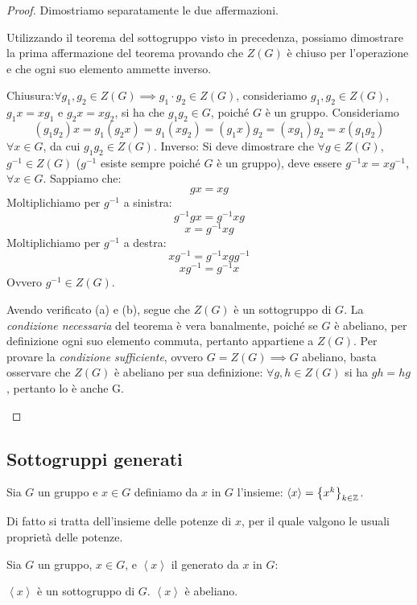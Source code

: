 \documentclass[11pt]{scrartcl}
\begin{document}
\begin{proof}
Dimostriamo separatamente le due affermazioni.
	\begin{enumerate}[(1)]
		\ii Utilizzando il teorema del sottogruppo visto in precedenza, possiamo dimostrare la prima affermazione del teorema provando che $Z(G)$ è chiuso per l'operazione e che ogni suo elemento ammette inverso.
			\begin{enumerate}[(a)]
			\ii Chiusura:$\forall g_1,g_2 \in Z(G) \implies g_1 \cdot g_2 \in Z(G)$, consideriamo $g_1,g_2 \in Z(G)$, $g_1x=xg_1$ e $g_2x=xg_2$, si ha che $g_1g_2 \in G$, poiché $G$ è un gruppo. Consideriamo
				\[ (g_1g_2)x
				=
				g_1(g_2x)
				=
				g_1(xg_2)
				=
				(g_1x)g_2
				=
				(xg_1)g_2
				=
				x(g_1g_2)
				\]
			$\forall x \in G$, da cui $g_1g_2 \in Z(G)$.	
			\ii Inverso: Si deve dimostrare che $\forall g \in Z(G)$, $ g^{-1} \in Z(G)$ ($g^{-1}$ esiste sempre poiché $G$ è un gruppo), deve essere $g^{-1}x=xg^{-1}$, $\forall x \in G$. Sappiamo che:
				\[
				gx=xg
				\]
			Moltiplichiamo per $g^{-1}$ a sinistra:	
				\[
				g^{-1}gx=g^{-1}xg
				\]
				\[
				x=g^{-1}xg
				\]
			Moltiplichiamo per $g^{-1}$ a destra:
				\[
				xg^{-1}=g^{-1}xgg^{-1}
				\]
				\[
				xg^{-1}=g^{-1}x
				\]
			Ovvero $g^{-1} \in Z(G)$.
			\end{enumerate} 
		Avendo verificato (a) e (b), segue che $Z(G)$ è un sottogruppo di $G$.	
		\ii La \emph{condizione necessaria} del teorema è vera banalmente, poiché se $G$ è abeliano, per definizione ogni suo elemento commuta, pertanto appartiene a $Z(G)$. Per provare la \emph{condizione sufficiente}, ovvero $G=Z(G) \implies G$ abeliano, basta osservare che $Z(G)$ è abeliano per sua definizione: $\forall g,h \in Z(G)$ si ha $gh=hg$, pertanto lo è anche G.
	\end{enumerate}
\end{proof}

\newpage

\subsection{Sottogruppi generati}
\begin{definition}
Sia $G$ un gruppo e $x \in G$ definiamo  da $x$ in $G$ l'insieme: $\left<x\right>=\left\{x^{k}\right\}_{k \in \mathbb Z}$.
\end{definition}
Di fatto si tratta dell'insieme delle potenze di $x$, per il quale valgono le usuali proprietà delle potenze.

\begin{theorem}
Sia $G$ un gruppo, $x \in G$, e $\left<x\right>$ il generato da $x$ in $G$:
\begin{enumerate}[(1)]
	\ii $\left<x\right>$ è un sottogruppo di $G$.
	\ii $\left<x\right>$ è abeliano.
\end{enumerate}
\end{theorem}
\end{document}
